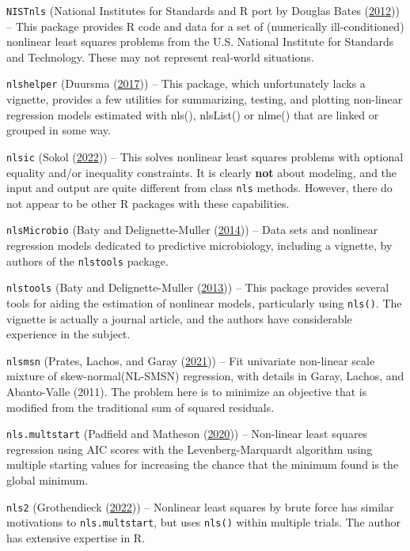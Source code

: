 \texttt{NISTnls} (National Institutes for Standards and R port by Douglas Bates (\protect\hyperlink{ref-NISTnls-manual}{2012})) -- This package provides R code and data for a set of
(numerically ill-conditioned) nonlinear least squares problems from the U.S. National
Institute for Standards and Technology. These may not represent real-world situations.

\texttt{nlshelper} (Duursma (\protect\hyperlink{ref-nlshelper-manual}{2017})) -- This package, which unfortunately lacks a
vignette, provides a few utilities for summarizing, testing, and plotting
non-linear regression models estimated with nls(), nlsList() or nlme() that
are linked or grouped in some way.

\texttt{nlsic} (Sokol (\protect\hyperlink{ref-nlsic-manual}{2022})) -- This solves nonlinear least squares problems with optional
equality and/or inequality constraints. It is clearly \textbf{not} about modeling, and
the input and output are quite different from class \texttt{nls} methods. However, there do
not appear to be other R packages with these capabilities.

\texttt{nlsMicrobio} (Baty and Delignette-Muller (\protect\hyperlink{ref-nlsMicrobio-manual}{2014})) -- Data sets and nonlinear regression models
dedicated to predictive microbiology, including a vignette, by authors of the
\texttt{nlstools} package.

\texttt{nlstools} (Baty and Delignette-Muller (\protect\hyperlink{ref-p-nlstools}{2013})) -- This package provides several tools for aiding the estimation
of nonlinear models, particularly using \texttt{nls()}. The vignette is actually a journal
article, and the authors have considerable experience in the subject.

\texttt{nlsmsn} (Prates, Lachos, and Garay (\protect\hyperlink{ref-m-nlsmsn}{2021})) -- Fit univariate non-linear scale mixture of skew-normal(NL-SMSN)
regression, with details in Garay, Lachos, and Abanto-Valle (2011). The problem
here is to minimize an objective that is modified from the traditional sum of squared
residuals.

\texttt{nls.multstart} (Padfield and Matheson (\protect\hyperlink{ref-nlsmultstart}{2020})) -- Non-linear least squares regression using
AIC scores with the Levenberg-Marquardt algorithm using multiple starting values
for increasing the chance that the minimum found is the global minimum.

\texttt{nls2} (Grothendieck (\protect\hyperlink{ref-nls2-22}{2022})) -- Nonlinear least squares by brute force has similar
motivations to \texttt{nls.multstart}, but uses \texttt{nls()} within multiple trials. The author
has extensive expertise in R.

